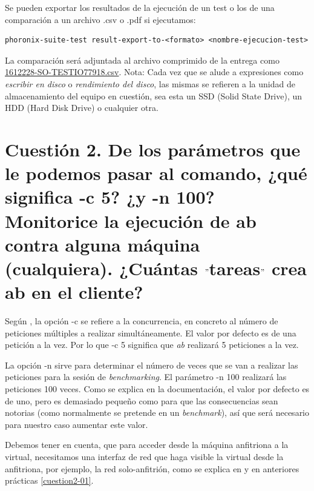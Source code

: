 Se pueden exportar los resultados de la ejecución de un test o los de una comparación a un archivo .csv o .pdf si ejecutamos:

\begin{verbatim}
phoronix-suite-test result-export-to-<formato> <nombre-ejecucion-test>
\end{verbatim}

La comparación será adjuntada al archivo comprimido de la entrega como \url{1612228-SO-TESTIO77918.csv}.
\newline
\newline
Nota: Cada vez que se alude a expresiones como \textit{escribir en disco} o \textit{rendimiento del disco}, las mismas se refieren a la unidad de almacenamiento  del equipo en cuestión, sea esta un SSD (Solid State Drive), un HDD (Hard Disk Drive) o cualquier otra.

\section{Cuestión 2. De los parámetros que le podemos pasar al comando, ¿qué significa -c 5? ¿y -n 100? Monitorice la ejecución de ab contra alguna máquina (cualquiera). ¿Cuántas $"$tareas$"$ crea ab en el cliente?}

Según \cite{ab}, la opción -c se refiere a la concurrencia, en concreto al número de peticiones múltiples a realizar simultáneamente. El valor por defecto es de una petición a la vez. Por lo que -c 5 significa que \textit{ab} realizará 5 peticiones a la vez.

La opción -n sirve para determinar el número de veces que se van a realizar las peticiones para la sesión de \textit{benchmarking}. El parámetro -n 100 realizará las peticiones 100 veces. Como se explica en la documentación, el valor por defecto es de uno, pero es demasiado pequeño como para que las consecuencias sean notorias (como normalmente se pretende en un \textit{benchmark}), así que será necesario para nuestro caso aumentar este valor.

Debemos tener en cuenta, que para acceder desde la máquina anfitriona a la virtual, necesitamos una interfaz de red que haga visible la virtual desde la anfitriona, por ejemplo, la red solo-anfitrión, como se explica en \cite{redvb} y en anteriores prácticas \ref{cuestion2-01}.

